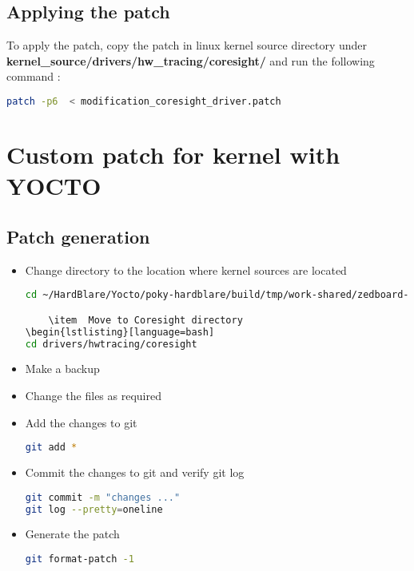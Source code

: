 \subsection{Applying the patch}
\vspace{1em}
To apply the patch, copy the patch in linux kernel source directory under \\ \textbf{kernel\_source/drivers/hw\_tracing/coresight/} and run the following command : 

\begin{lstlisting}[language=bash]
patch -p6  < modification_coresight_driver.patch
\end{lstlisting}

\section{Custom patch for kernel with YOCTO}

\subsection{Patch generation}
\begin{itemize}
	\item Change directory to the location where kernel sources are located
\begin{lstlisting}[language=bash]
cd ~/HardBlare/Yocto/poky-hardblare/build/tmp/work-shared/zedboard-hardblare/kernel-source

	\item  Move to Coresight directory
\begin{lstlisting}[language=bash]
cd drivers/hwtracing/coresight
\end{lstlisting}
	\item  Make a backup 
	\item  Change the files as required
	\item  Add the changes to git 
\begin{lstlisting}[language=bash]
git add *
\end{lstlisting}
	\item  Commit the changes to git and verify git log
\begin{lstlisting}[language=bash]
git commit -m "changes ..."
git log --pretty=oneline
\end{lstlisting}
	\item  Generate the patch
\begin{lstlisting}[language=bash]
git format-patch -1
\end{lstlisting}
\end{itemize}

